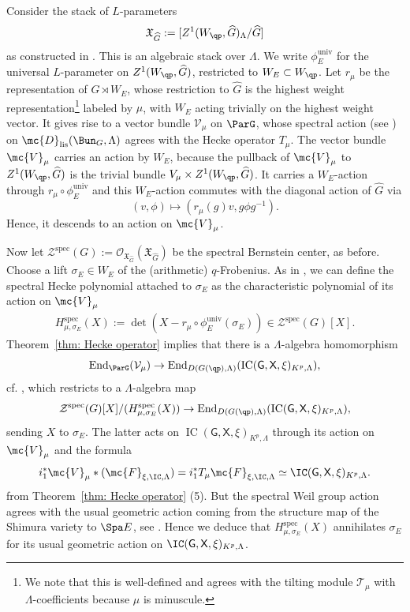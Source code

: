 \documentclass[letterpaper,11pt]{amsart}
\begin{document}
Consider the stack of $L$-parameters
\[\mathfrak{X}_{\widehat{G}} :=[Z^1(W_{\qp},\widehat{G})_\Lambda/\widehat{G}]\] 
as constructed in \cite[Section VIII]{FSGeomLLC}. This is an algebraic stack over $\Lambda$. We write $\phi_E^\mathrm{univ}$ for the universal $L$-parameter on $Z^1(W_{\qp},\widehat{G})$, restricted to $W_E\subset W_{\qp}$. Let $r_\mu$ be the representation of $\widehat{G}\rtimes W_E$, whose restriction to $\widehat{G}$ is the highest weight representation\footnote{We note that this is well-defined and agrees with the tilting module $\mathcal{T}_{\mu}$ with $\Lambda$-coefficients because $\mu$ is minuscule.} labeled by $\mu$, with $W_E$ acting trivially on the highest weight vector. It gives rise to a vector bundle $\mathcal{V}_\mu$ on $\ParG$, whose spectral action (see \cite[Section IX.2, X]{FSGeomLLC}) on $\mc{D}_{\mathrm{lis}}(\Bun_G,\Lambda)$ agrees with the Hecke operator $T_\mu$. The vector bundle $\mc{V}_\mu$ carries an action by $W_E$, because the pullback of $\mc{V}_\mu$ to $Z^1(W_{\qp},\widehat{G})$ is the trivial bundle $V_\mu\times Z^1(W_{\qp},\widehat{G})$. It carries a $W_E$-action through $r_\mu\circ \phi_E^\mathrm{univ}$ and this $W_E$-action commutes with the diagonal action of $\widehat{G}$ via 
\[(v,\phi)\mapsto (r_\mu(g)v, g\phi g^{-1}).\] 
Hence, it descends to an action on $\mc{V}_\mu$.

Now let $\mathcal{Z}^\mathrm{spec}(G):=\mathcal{O}_{\mathfrak{X}_{\widehat{G}}}(\mathfrak{X}_{\widehat{G}})$ be the spectral Bernstein center, as before. Choose a lift $\sigma_E\in W_E$ of the (arithmetic) $q$-Frobenius.  As in \cite[Definition 9.3.2]{DvHKZ}, we can define the spectral Hecke polynomial attached to $\sigma_E$ as the characteristic polynomial of its action on $\mc{V}_\mu$
\begin{align}
 H_{\mu,\sigma_E}^\mathrm{spec}(X):= \operatorname{det}\left(X-r_{\mu} \circ  \phi_E^{\operatorname{univ}}(\sigma_E)\right) \in \mathcal{Z}^\mathrm{spec}(G)[X].
\end{align}
Theorem~\ref{thm: Hecke operator} implies that 
there is a $\Lambda$-algebra homomorphism
\[\mathrm{End}_{\ParG}(\mathcal{V}_\mu)\to \mathrm{End}_{D(G(\qp),\Lambda)}(\operatorname{IC}(\mathsf{G},\mathsf{X},\xi)_{K^p,\Lambda}),\]
cf. \cite[Theorem 9.1.4]{DvHKZ}, which restricts to a $\Lambda$-algebra map
\[\mathcal{Z}^\mathrm{spec}(G)[X]/(H_{\mu,\sigma_E}^\mathrm{spec}(X))\to \mathrm{End}_{D(G(\qp),\Lambda)}(\operatorname{IC}(\mathsf{G},\mathsf{X},\xi)_{K^p,\Lambda}),\]
sending $X$ to $\sigma_E$. The latter acts on $\operatorname{IC}(\mathsf{G},\mathsf{X},\xi)_{K^p,\Lambda}$ through its action on $\mc{V}_\mu$ and the formula
\[i_1^\ast\mc{V}_\mu\ast (\mc{F}_{\xi, \IC, \Lambda})=i_{1}^{*}T_{\mu}\mc{F}_{\xi, \IC, \Lambda} \simeq \IC(\mathsf{G},\mathsf{X}, \xi)_{K^p,\Lambda}.\]
from Theorem~\ref{thm: Hecke operator} (5). But the spectral Weil group action agrees with the usual geometric action coming from the structure map of the Shimura variety to $\Spa E$, see \cite[Theorem 9.1.4]{DvHKZ}. Hence we deduce that $H_{\mu,\sigma_E}^\mathrm{spec}(X)$ annihilates $\sigma_E$ for its usual geometric action on $\IC(\mathsf{G},\mathsf{X}, \xi)_{K^p,\Lambda}$.
\end{document}
